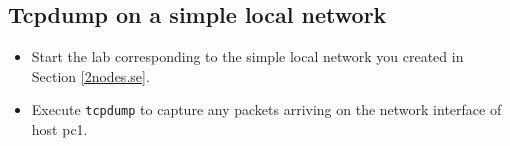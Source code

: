 \documentclass[12pt]{book}
\begin{document}
\subsection{Tcpdump on a simple local network}

\begin{itemize}[--]
\item Start the lab corresponding to the simple local network you
  created in Section \ref{2nodes.se}. 
\item Execute \verb$tcpdump$ to capture any packets arriving on the
  network interface of host pc1. 
\end{itemize}



 
\end{document}
